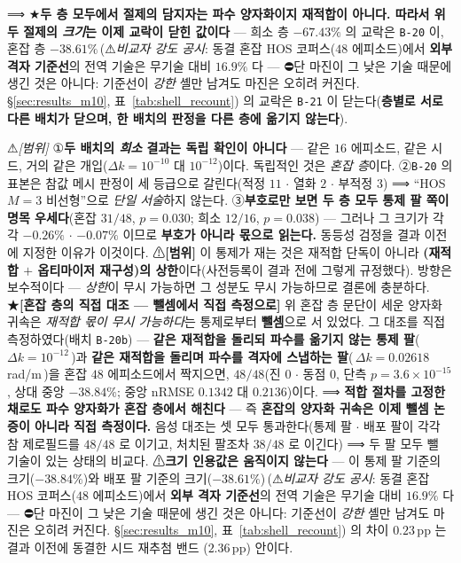 \documentclass[11pt]{report}
\numberwithin{equation}{chapter}
\numberwithin{figure}{chapter}
\numberwithin{table}{chapter}
\newcommand{\CmpSkill}{\,(⚠\emph{비교자 강도 공시}: 동결 혼잡 HOS 코퍼스($48$ 에피소드)에서
\textbf{외부 격자 기준선}의 전역 기술은 무기술 대비 $16.9\%$ 다 --- ⛔단 마진이 그 낮은
기술 때문에 생긴 것은 아니다: 기준선이 \emph{강한} 셸만 남겨도 마진은 오히려 커진다.
\S\ref{sec:results_m10}, 표~\ref{tab:shell_recount})}
\begin{document}
⟹ ★\textbf{두 층 모두에서 절제의 담지자는 파수 양자화이지 재적합이 아니다. 따라서 위
두 절제의 \emph{크기}는 이제 교락이 닫힌 값이다} --- 희소 층 $-67.43\%$ 의 교락은
\texttt{B-20} 이, 혼잡 층 $-38.61\%$\CmpSkill{} 의 교락은 \texttt{B-21} 이 닫는다(\textbf{층별로
서로 다른 배치가 닫으며, 한 배치의 판정을 다른 층에 옮기지 않는다}).

⚠\emph{[범위]} ①\textbf{두 배치의 \emph{희소} 결과는 독립 확인이 아니다} --- 같은
$16$ 에피소드, 같은 시드, 거의 같은 개입($\Delta k = 10^{-10}$ 대 $10^{-12}$)이다.
독립적인 것은 \emph{혼잡 층}이다. ②\texttt{B-20} 의 표본은 참값 메시 판정이 세 등급으로
갈린다(적정 $11$ $\cdot$ 열화 $2$ $\cdot$ 부적정 $3$) ⟹ ``HOS $M{=}3$ 비선형''으로
\emph{단일 서술}하지 않는다. ③\textbf{부호로만 보면 두 층 모두 통제 팔 쪽이 명목
우세다}(혼잡 $31/48$, $p = 0.030$; 희소 $12/16$, $p = 0.038$) --- 그러나 그 크기가
각각 $-0.26\%$ $\cdot$ $-0.07\%$ 이므로 \textbf{부호가 아니라 몫으로 읽는다.} 동등성
검정을 결과 이전에 지정한 이유가 이것이다.
⚠\textbf{[범위]} 이 통제가 재는 것은 재적합 단독이 아니라
\textbf{(재적합 $+$ 옵티마이저 재구성)의 상한}이다(사전등록이 결과 전에 그렇게 규정했다).
방향은 보수적이다 --- \emph{상한}이 무시 가능하면 그 성분도 무시 가능하므로 결론에 충분하다.
★\textbf{[혼잡 층의 직접 대조 --- 뺄셈에서 직접 측정으로]} 위 혼잡 층 문단이 세운
양자화 귀속은 \emph{재적합 몫이 무시 가능하다}는 통제로부터 \textbf{뺄셈}으로 서 있었다.
그 대조를 직접 측정하였다(배치 \texttt{B-20b}) --- \textbf{같은 재적합을 돌리되 파수를
옮기지 않는 통제 팔}(\,$\Delta k = 10^{-12}$\,)과 \textbf{같은 재적합을 돌리며 파수를
격자에 스냅하는 팔}(\,$\Delta k = 0.02618$\,rad/m\,)을 혼잡 $48$ 에피소드에서 짝지으면,
\textbf{$48/48$}(진 $0$ $\cdot$ 동점 $0$, 단측 $p = 3.6\times10^{-15}$, 상대 중앙
$-38.84\%$; 중앙 nRMSE $0.1342$ 대 $0.2136$)이다.
⟹ \textbf{적합 절차를 고정한 채로도 파수 양자화가 혼잡 층에서 해친다} --- 즉
\textbf{혼잡의 양자화 귀속은 이제 뺄셈 논증이 아니라 직접 측정이다.}
음성 대조는 셋 모두 통과한다(통제 팔 $\cdot$ 배포 팔이 각각 참 제로필드를 $48/48$ 로
이기고, 처치된 팔조차 $38/48$ 로 이긴다) ⟹ 두 팔 모두 뺄 기술이 있는 상태의 비교다.
⚠\textbf{크기 인용값은 움직이지 않는다} --- 이 통제 팔 기준의 크기($-38.84\%$)와 배포 팔
기준의 크기($-38.61\%$)\CmpSkill{} 의 차이 $0.23$\,pp 는 결과 이전에 동결한 시드 재추첨 밴드
($2.36$\,pp) 안이다.
\end{document}
